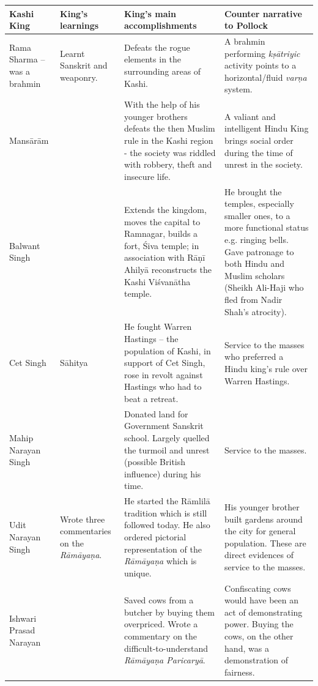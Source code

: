 \begin{longtable}{|p{1.4cm}|p{1.6cm}|p{2.6cm}|p{2.6cm}|}
\hline
Kashi King & King’s learnings & King’s main accomplishments & Counter narrative to Pollock \\
\hline
Rama Sharma – was a brahmin & Learnt Sanskrit and weaponry. & Defeats the rogue elements in the surrounding areas of Kashi. & A brahmin performing \textit{kṣātriyic} activity points to a horizontal/fluid \textit{varṇa}\index{varna@\textit{varṇa}} system. \\
\hline
Mansārām &   & With the help of his younger brothers defeats the then Muslim rule in the Kashi region - the society was riddled with robbery, theft and insecure life. & A valiant and intelligent Hindu King brings social order during the time of unrest in the society. \\
\hline
Balwant Singh &   & Extends the kingdom, moves the capital to Ramnagar, builds a fort, Śiva temple; in association with Rāṇī Ahilyā reconstructs the Kashi Viśvanātha temple. & He brought the temples, especially smaller ones, to a more functional status e.g. ringing bells. Gave patronage to both Hindu and Muslim scholars (Sheikh Ali-Haji who fled from Nadir Shah’s atrocity). \\
\hline
Cet Singh & Sāhitya & He fought Warren Hastings – the population of Kashi, in support of Cet Singh, rose in revolt against Hastings who had to beat a retreat. & Service to the masses who preferred a Hindu king’s rule over Warren Hastings. \\
\hline
Mahip Narayan Singh &   & Donated land for Government Sanskrit school.\index{Sanskrit schools} Largely quelled the turmoil and unrest (possible British influence) during his time. & Service to the masses. \\
\hline
Udit Narayan Singh & Wrote three commentaries on the \textit{Rāmāyaṇa}.\index{Ramayana@\textit{Rāmāyaṇa}} & He started the Rāmlilā tradition which is still followed today. He also ordered pictorial representation of the \textit{Rāmāyaṇa} which is unique. & His younger brother built gardens around the city for general population. These are direct evidences of service to the masses. \\
\hline
Ishwari Prasad Narayan &   & Saved cows from a butcher by buying them overpriced. Wrote a commentary on the difficult-to-understand \textit{Rāmāyaṇa Paricaryā}.\index{Ramayanaparicarya@\textit{Rāmāyaṇa Paricaryā}} & Confiscating cows would have been an act of demonstrating power. Buying the cows, on the other hand, was a demonstration of fairness. \\
\hline
\end{longtable}


